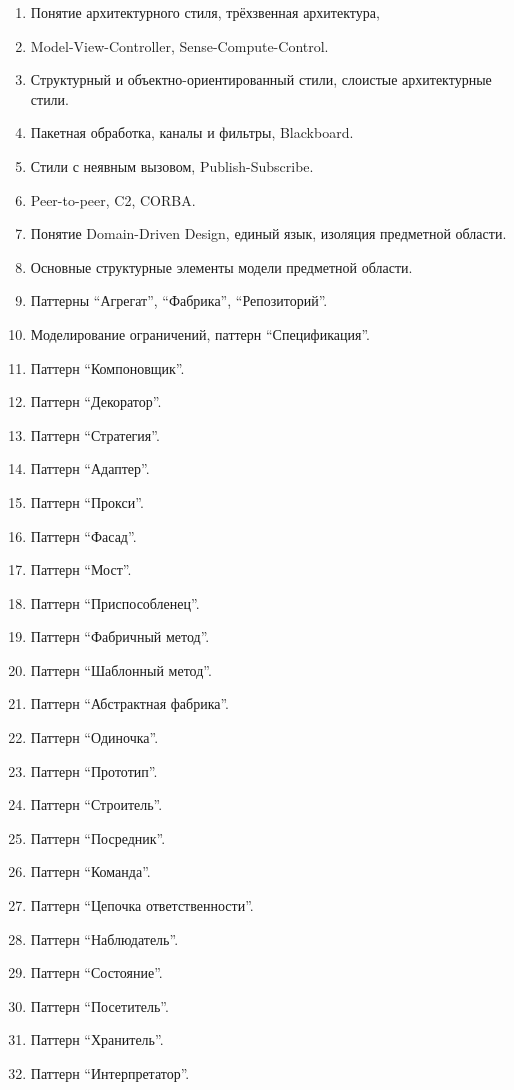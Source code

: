 \documentclass[a5paper]{article}
\begin{document}
\begin{enumerate}
    \item Понятие архитектурного стиля, трёхзвенная архитектура, 
    \item Model-View-Controller, Sense-Compute-Control.
    \item Структурный и объектно-ориентированный стили, слоистые архитектурные стили.
    \item Пакетная обработка, каналы и фильтры, Blackboard.
    \item Стили с неявным вызовом, Publish-Subscribe.
    \item Peer-to-peer, C2, CORBA.
    \item Понятие Domain-Driven Design, единый язык, изоляция предметной области.
    \item Основные структурные элементы модели предметной области.
    \item Паттерны ``Агрегат'', ``Фабрика'', ``Репозиторий''.
    \item Моделирование ограничений, паттерн ``Спецификация''.
    \item Паттерн ``Компоновщик''.
    \item Паттерн ``Декоратор''.
    \item Паттерн ``Стратегия''.
    \item Паттерн ``Адаптер''.
    \item Паттерн ``Прокси''.
    \item Паттерн ``Фасад''.
    \item Паттерн ``Мост''.
    \item Паттерн ``Приспособленец''.
    \item Паттерн ``Фабричный метод''.
    \item Паттерн ``Шаблонный метод''.
    \item Паттерн ``Абстрактная фабрика''.
    \item Паттерн ``Одиночка''.
    \item Паттерн ``Прототип''.
    \item Паттерн ``Строитель''.
    \item Паттерн ``Посредник''.
    \item Паттерн ``Команда''.
    \item Паттерн ``Цепочка ответственности''.
    \item Паттерн ``Наблюдатель''.
    \item Паттерн ``Состояние''.
    \item Паттерн ``Посетитель''.
    \item Паттерн ``Хранитель''.
    \item Паттерн ``Интерпретатор''.

\end{enumerate}
\end{document}
